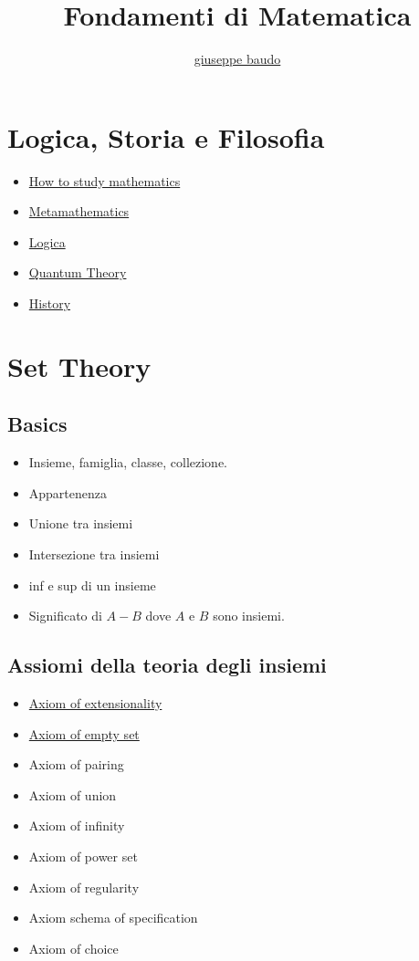 \documentclass[a4paper,10pt]{article}
\title{Fondamenti di Matematica}
\author{\href{http://www.baudo.hol.es}{giuseppe baudo}}
\begin{document}
\maketitle

\section{Logica, Storia e Filosofia}
\begin{itemize}
 \item \href{HowToStudy.html}{How to study mathematics}
  \item \href{Metamathematics.html}{Metamathematics}
  \item \href{Logics.html}{Logica}
  \item \href{QuantumTheory.html}{Quantum Theory}
  \item \href{history.html}{History} 
\end{itemize}

\section{Set Theory}
\subsection*{Basics}
\begin{itemize}
 \item Insieme, famiglia, classe, collezione.
 \item Appartenenza
 \item Unione tra insiemi
 \item Intersezione tra insiemi 
 \item inf e sup di un insieme
 \item Significato di $A - B$ dove $A$ e $B$ sono insiemi.
\end{itemize}
 
\subsection*{Assiomi della teoria degli insiemi}
\begin{itemize}
 \item \href{./Extensionality.html}{Axiom of extensionality}
 \item \href{./EmptySet.html}{Axiom of empty set}
 \item Axiom of pairing
 \item Axiom of union
 \item Axiom of infinity
 \item Axiom of power set
 \item Axiom of regularity
 \item Axiom schema of specification
 \item Axiom of choice
\end{itemize}
\end{document}
